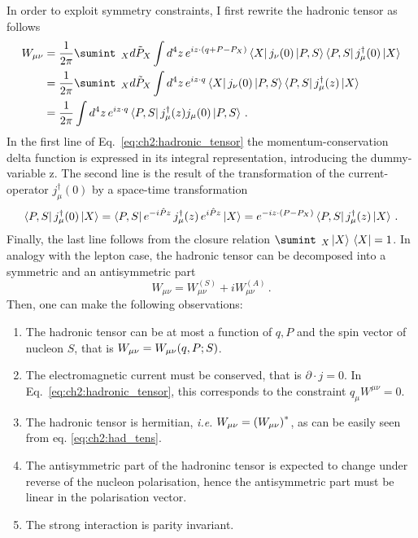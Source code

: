 In order to exploit symmetry constraints, I first rewrite the hadronic tensor as follows
\begin{equation}
    \begin{split}
        W_{\mu\nu} &= \frac{1}{2\pi} \sumint_{\;\;X} \tilde{d P_X} \int d^4z \, e^{iz \cdot \qty(q + P - P_{X})}\bra{X} j_{\nu}(0) \ket{P,S} \bra{P,S} j^{\dag}_{\mu}(0) \ket{X}\\
        & = \frac{1}{2\pi} \sumint_{\;\;X} \tilde{d P_X} \int d^4z \, e^{iz \cdot q}\bra{X} j_{\nu}(0) \ket{P,S} \bra{P,S} j^{\dag}_{\mu}(z) \ket{X} \\
        & = \frac{1}{2\pi} \int d^4z \, e^{i z \cdot q} \bra{P,S} j^{\dag}_{\mu}(z) j_{\mu}(0) \ket{P,S} \,.
    \end{split}
    \label{eq:ch2:hadronic_tensor}
\end{equation}
In the first line of Eq.~\eqref{eq:ch2:hadronic_tensor} the momentum-conservation delta function is expressed in its integral representation, introducing the dummy-variable z. The second line is the result of the transformation of the current-operator $j^{\dag}_{\mu}(0)$ by a space-time transformation 
\begin{equation}
    \bra{P,S} j^{\dag}_{\mu}(0) \ket{X} =  \bra{P,S} e^{-i\hat{P}z} \, j^{\dag}_{\mu}(z) \, e^{i\hat{P}z} \ket{X} =  e^{-i z \cdot \qty(P - P_X )}\bra{P,S} j^{\dag}_{\mu}(z) \ket{X}\,.
\end{equation}
Finally, the last line follows from the closure relation $\sumint_{\;\; X} \ket*{X} \bra*{X} = 1 $. In analogy with the lepton case, the hadronic tensor can be decomposed into a symmetric and an antisymmetric part
\begin{equation}
    W_{\mu \nu} =  W_{\mu \nu}^{(S)}  + i W_{\mu \nu}^{(A)}\,.
\end{equation}
Then, one can make the following observations:
\begin{enumerate}
    \item The hadronic tensor can be at most a function of $q, P$ and the spin vector of nucleon $S$, that is $W_{\mu \nu} = W_{\mu \nu}\qty(q,P;S)$.  
    \item The electromagnetic current must be conserved, that is $\partial \cdot j = 0$. In Eq.~\eqref{eq:ch2:hadronic_tensor}, this corresponds to the constraint $q_{\mu} W^{\mu \nu} = 0$.
    \item The hadronic tensor is hermitian, \textit{i.e.} $W_{\mu \nu} = \qty(W_{\mu \nu})^{*}$, as can be easily seen from eq. \eqref{eq:ch2:had_tens}. 
    \item The antisymmetric part of the hadroninc tensor is expected to change under reverse of the nucleon polarisation, hence the antisymmetric part must be linear in the polarisation vector.
    \item The strong interaction is parity invariant.
\end{enumerate}
